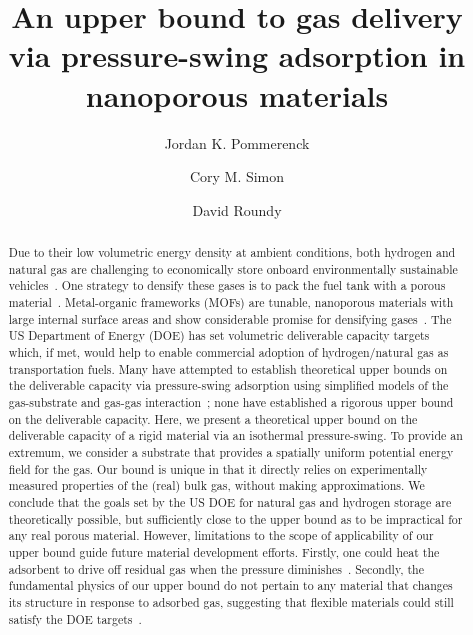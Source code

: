 \documentclass[letterpaper,twocolumn,amsmath,amssymb,jcp]{revtex4-1}
\begin{document}
\title{
An upper bound to gas delivery via pressure-swing adsorption in nanoporous materials}

\author{Jordan K. Pommerenck}
\author{Cory M. Simon}
\author{David Roundy}

\begin{abstract}
Due to their low volumetric energy density at ambient conditions, both hydrogen
and natural gas are challenging to economically store onboard environmentally
sustainable vehicles~\cite{mason2014evaluating, sircar2002pressure}. One
strategy to densify these gases is to pack the fuel tank with a porous
material~\cite{?}. Metal-organic frameworks (MOFs) are tunable, nanoporous
materials with large internal surface areas and show considerable promise for
densifying gases~\cite{makal2012methane,mason2014evaluating,
suh2011hydrogen,garcia2018benchmark, schoedel2016role}. The US Department of
Energy (DOE) has set volumetric deliverable capacity targets~\cite{simon2015materials, h2targetsDOE} which, if met, would help to enable 
commercial adoption of hydrogen/natural gas as
transportation fuels. Many have attempted to establish theoretical upper bounds
on the deliverable capacity via pressure-swing adsorption using simplified
models of the gas-substrate and gas-gas interaction~\cite{gomez2014exploring, 
gomez2017impact, kaija2018high, lee2019predicting}; none have
established a rigorous upper bound on the deliverable capacity.
Here, we present a theoretical upper bound on the deliverable capacity of a
rigid material via an isothermal pressure-swing. To provide an extremum, we
consider a substrate that provides a spatially uniform potential energy field
for the gas. Our bound is unique in that it directly relies on experimentally
measured properties of the (real) bulk gas, without making approximations.
We conclude that the goals set by the US DOE for natural gas and hydrogen
storage are theoretically possible, but sufficiently close to the upper bound
as to be impractical for any real porous material. However, limitations to the
scope of applicability of our upper bound guide future material development 
efforts. Firstly, one could heat the adsorbent to drive off residual gas when
the pressure diminishes~\cite{gomez2014exploring}. Secondly, the fundamental
physics of our upper bound do not pertain to any material that changes its
structure in response to adsorbed gas, suggesting that flexible materials could
still satisfy the DOE targets~\cite{schneemann2014flexible, choi2008broadly, mason2015methane}.


\end{abstract}
\end{document}
